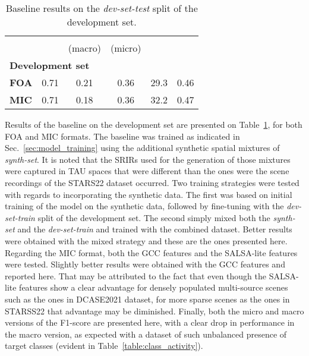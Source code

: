 \documentclass{article}
\begin{document}
\begin{sloppy}
\begin{table}[t]
\begin{adjustbox}{max width=\columnwidth}
\begin{tabular}{lccccc}
                                  & \multicolumn{1}{l}{} & \multicolumn{1}{l}{} & \multicolumn{1}{l}{} & \multicolumn{1}{l}{} & \multicolumn{1}{l}{} \\
                                  &  & (macro) & (micro) &  &  \\                                  
\hline
\multicolumn{6}{l}{\textbf{Development set}}                                                                                                                                                                                          \\ \hline
\multicolumn{1}{l|}{\textbf{FOA}} & 0.71                                & 0.21                                       & 0.36                                       & 29.3                           & 0.46                            \\
\multicolumn{1}{l|}{\textbf{MIC}} & 0.71                                & 0.18                                       & 0.36                                       & 32.2                           & 0.47                            \\ \hline
\end{tabular}
\end{adjustbox}
\caption{Baseline results on the \emph{dev-set-test} split of the development set.}
\label{table:baseline_results}
\end{table} 
Results of the baseline on the development set are presented on Table~\ref{table:baseline_results}, for both FOA and MIC formats. The baseline was trained as indicated in Sec.~\ref{sec:model_training} using the additional synthetic spatial mixtures of \emph{synth-set}. It is noted that the SRIRs used for the generation of those mixtures were captured in TAU spaces that were different than the ones were the scene recordings of the STARS22 dataset occurred. Two training strategies were tested with regards to incorporating the synthetic data. The first was based on initial training of the model on the synthetic data, followed by fine-tuning with the \emph{dev-set-train} split of the development set. The second simply mixed both the \emph{synth-set} and the \emph{dev-set-train} and trained with the combined dataset. Better results were obtained with the mixed strategy and these are the ones presented here. Regarding the MIC format, both the GCC features and the SALSA-lite features were tested. Slightly better results were obtained with the GCC features and reported here. That may be attributed to the fact that even though the SALSA-lite features show a clear advantage for densely populated multi-source scenes \cite{nguyen2022salsa} such as the ones in DCASE2021 dataset, for more sparse scenes as the ones in STARSS22 that advantage may be diminished. Finally, both the micro and macro versions of the F1-score are presented here, with a clear drop in performance in the macro version, as expected with a dataset of such unbalanced presence of target classes (evident in Table~\ref{table:class_activity}).

\end{sloppy}
\end{document}
